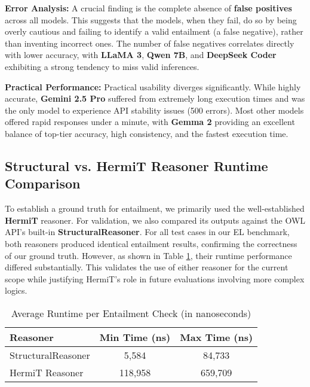 \documentclass[11pt]{article}
\begin{document}
\textbf{Error Analysis:} A crucial finding is the complete absence of \textbf{false positives} across all models. This suggests that the models, when they fail, do so by being overly cautious and failing to identify a valid entailment (a false negative), rather than inventing incorrect ones. The number of false negatives correlates directly with lower accuracy, with \textbf{LLaMA 3}, \textbf{Qwen 7B}, and \textbf{DeepSeek Coder} exhibiting a strong tendency to miss valid inferences.

\textbf{Practical Performance:} Practical usability diverges significantly. While highly accurate, \textbf{Gemini 2.5 Pro} suffered from extremely long execution times and was the only model to experience API stability issues (500 errors). Most other models offered rapid responses under a minute, with \textbf{Gemma 2} providing an excellent balance of top-tier accuracy, high consistency, and the fastest execution time.


\newpage

\subsection{Structural vs. HermiT Reasoner Runtime Comparison}

To establish a ground truth for entailment, we primarily used the well-established \textbf{HermiT} reasoner. For validation, we also compared its outputs against the OWL API's built-in \textbf{StructuralReasoner}. For all test cases in our EL benchmark, both reasoners produced identical entailment results, confirming the correctness of our ground truth. However, as shown in Table \ref{tab:reasoner-runtime}, their runtime performance differed substantially. This validates the use of either reasoner for the current scope while justifying HermiT’s role in future evaluations involving more complex logics.

\begin{table}[h!]
\centering
\caption{Average Runtime per Entailment Check (in nanoseconds)}
\label{tab:reasoner-runtime}
\begin{tabular}{|l|c|c|}
\hline
\textbf{Reasoner} & \textbf{Min Time (ns)} & \textbf{Max Time (ns)} \\
\hline
StructuralReasoner & 5,584 & 84,733 \\
HermiT Reasoner & 118,958 & 659,709 \\
\hline
\end{tabular}
\end{table}
\end{document}
